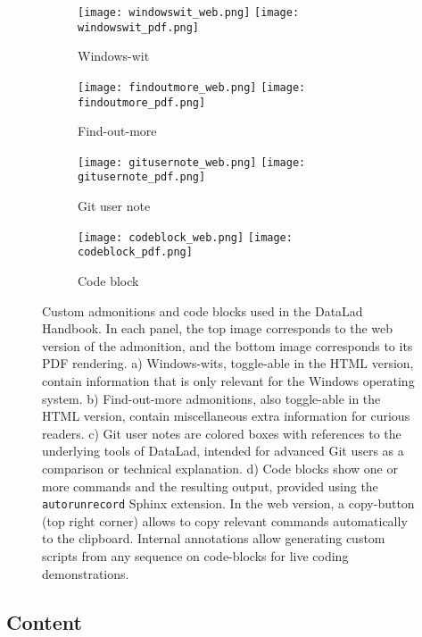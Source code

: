 \begin{figure}
	\hfill
	\begin{subfigure}{.44\textwidth}
	\texttt{[image: windowswit\_web.png]}
	\texttt{[image: windowswit\_pdf.png]}
	\caption{Windows-wit}
	\label{fig:handbook-windowswit}
	\end{subfigure}
	\begin{subfigure}{.55\textwidth}
		\texttt{[image: findoutmore\_web.png]}
		\texttt{[image: findoutmore\_pdf.png]}
		\caption{Find-out-more}
		\label{fig:handbook-findoutmore}
	\end{subfigure}
	\hfill
	\begin{subfigure}{.44\textwidth}
	\texttt{[image: gitusernote\_web.png]}
	\texttt{[image: gitusernote\_pdf.png]}
	\caption{Git user note}
	\label{fig:handbook-gitusernote}
	\end{subfigure}
	\hfill
	\begin{subfigure}{.55\textwidth}
	\texttt{[image: codeblock\_web.png]}
	\texttt{[image: codeblock\_pdf.png]}
	\caption{Code block}
	\label{fig:handbook-codeblock}
    \end{subfigure}
	\caption[Customization in the DataLad Handbook]{Custom admonitions and code blocks used in the DataLad Handbook. In each panel, the top image corresponds to the web version of the admonition, and the bottom image corresponds to its PDF rendering.
	a) Windows-wits, toggle-able in the HTML version, contain information that is only relevant for the Windows operating system. b) Find-out-more admonitions, also toggle-able in the HTML version, contain miscellaneous extra information for curious readers. c) Git user notes are colored boxes with references to the underlying tools of DataLad, intended for advanced Git users as a comparison or technical explanation. d) Code blocks show one or more commands and the resulting output, provided using the \texttt{autorunrecord} Sphinx extension. In the web version, a copy-button (top right corner) allows to copy relevant commands automatically to the clipboard. Internal annotations allow generating custom scripts from any sequence on code-blocks for live coding demonstrations.}
	\label{fig:handbook-admonitions}
\end{figure}

\subsection{Content}

